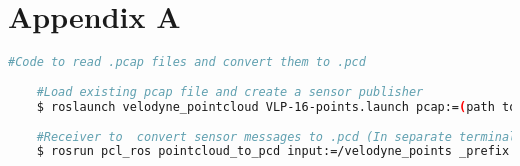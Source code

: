 %
%

\chapter{Appendix A}


\begin{table}[H]
	\centering
	
	\caption{Velodyne LiDAR Family}
	\label{velodyne-table}
\end{table}



\begin{lstlisting}[language=bash, caption={.pcap -> .pcd},label={lst:ros}]
	#Code to read .pcap files and convert them to .pcd 
	
	#Load existing pcap file and create a sensor publisher
	$ roslaunch velodyne_pointcloud VLP-16-points.launch pcap:=(path to .pcap file) 
	
	#Receiver to  convert sensor messages to .pcd (In separate terminal window)
	$ rosrun pcl_ros pointcloud_to_pcd input:=/velodyne_points _prefix:=(path to save it) 
	
\end{lstlisting}
